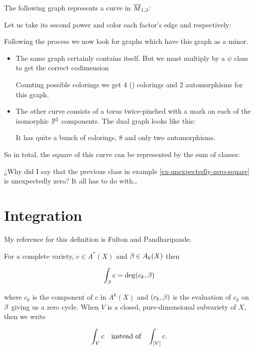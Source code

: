 \documentclass[12pt]{memoir}
\begin{document}
\begin{Ex}\label{ex-unexpectedly-zero-square}
    The following graph represents a curve in \(\overline{M}_{1,2}\):\par
    Let us take its second power and color each factor's edge  and  respectively:\par
    Following the process we now look for graphs which have this graph as a minor.
    \begin{itemize}
        \item The same graph certainly contains itself. But we must multiply by a \(\psi\) class to get the correct codimension\par
              Counting possible colorings we get 4 () colorings and 2 automorphisms for this graph.
        \item The other curve consists of a torus twice-pinched with a mark on each of the isomorphic \(\mathbb{P}^1\) components. The dual graph looks like this:\par
              It has quite a bunch of colorings, 8 and only two automorphisms.
    \end{itemize}
    So in total, the square of this curve can be represented by the sum of classes:
\end{Ex}

¿Why did I say that the previous class in example \ref{ex-unexpectedly-zero-square} is unexpectedly zero? It all has to do with\dots


\section{Integration}

My reference for this definition is Fulton and Pandharipande\cite{FPNotes}.

\begin{Def}
    For a complete  variety, \(c\in A^\ast(X)\) and \(\beta\in A_k(X)\) then

    \[\int_\beta c=\deg(c_k,\beta)\]

    where \(c_k\) is the component of \(c\) in \(A^k(X)\) and \((c_k,\beta)\) is the evaluation of \(c_k\) on \(\beta\) giving us a zero cycle. When \(V\) is a closed, pure-dimensional  subvariety of \(X\), then we write

    \[\int_V c\quad\text{instead of}\quad\int_{\left\lbrack V\right\rbrack}c.\]

\end{Def}
\end{document}
